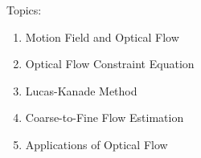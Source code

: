 \begin{frame}
\begin{columns}
  \begin{column}{0.5\textwidth}
    \begin{center}
      \end{center}
  \end{column}
  \begin{column}{0.5\textwidth}  %
    \begin{center}
    \end{center}
  \end{column}
\end{columns}

Topics:
\begin{enumerate}
\item Motion Field and Optical Flow
\item Optical Flow Constraint Equation
\item Lucas-Kanade Method
\item Coarse-to-Fine Flow Estimation
\item Applications of Optical Flow
\end{enumerate}
\end{frame}


